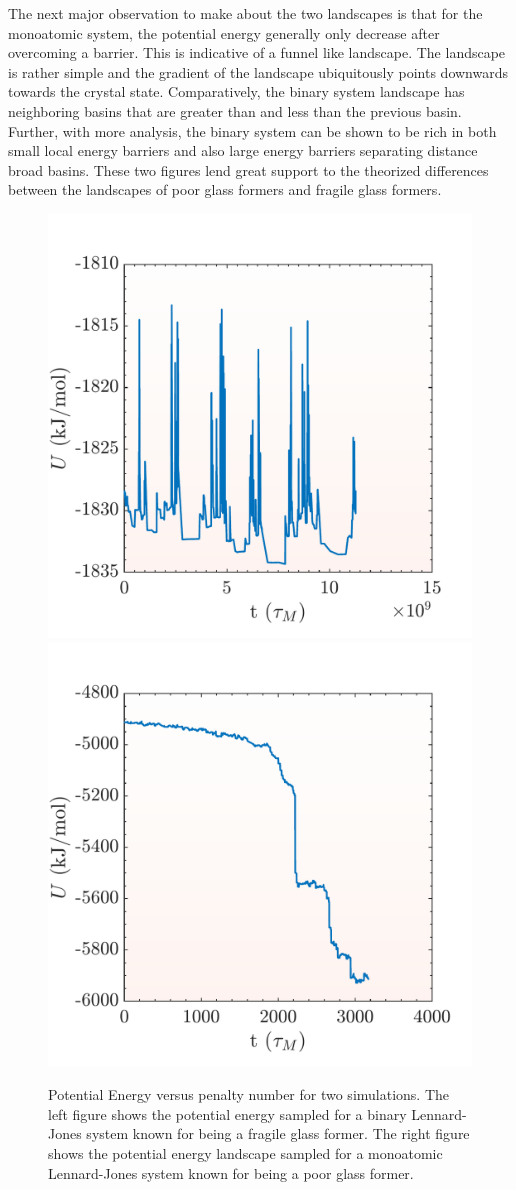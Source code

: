 The next major observation to make about the two landscapes is that for the monoatomic system, the potential energy generally only decrease after overcoming a barrier.  This is indicative of a funnel like landscape.  The landscape is rather simple and the gradient of the landscape ubiquitously points downwards towards the crystal state.  Comparatively, the binary system landscape has neighboring basins that are greater than and less than the previous basin.  Further, with more analysis, the binary system can be shown to be rich in both small local energy barriers and also large energy barriers separating distance broad basins.  These two figures lend great support to the theorized differences between the landscapes of poor glass formers and fragile glass formers.

\begin{figure}[h]
	\centering
	\includegraphics[width=.45\textwidth]{./Figures/Landscape/glassy_time.pdf}
	\hspace{.01\textwidth}
	\includegraphics[width=.45\textwidth]{./Figures/Landscape/crystal_time.pdf}
	\caption{Potential Energy versus penalty number for two simulations.  The left figure shows the potential energy sampled for a binary Lennard-Jones system known for being a fragile glass former.  The right figure shows the potential energy landscape sampled for a monoatomic Lennard-Jones system known for being a poor glass former.}
	\label{compare_time}
\end{figure}

